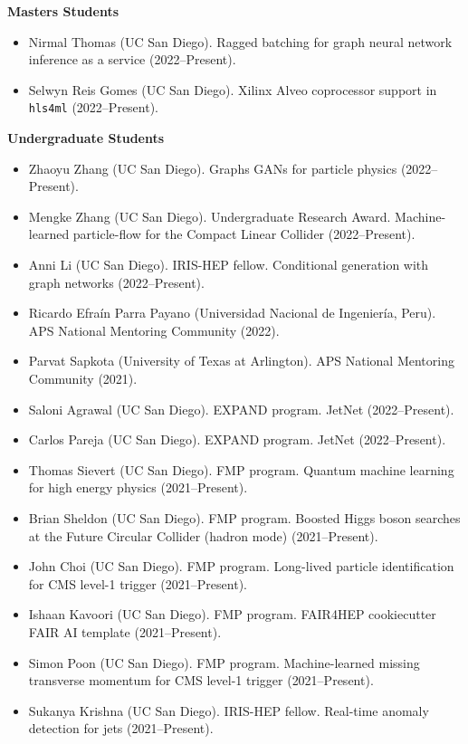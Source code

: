 \documentclass[11pt]{res}
\begin{document}
\begin{resume}
  \textbf{Masters Students}
  \begin{itemize}
    \itemsep-0.3em
    \item Nirmal Thomas (UC San Diego). Ragged batching for graph neural network inference as a service ({2022--Present}).
    \item Selwyn Reis Gomes (UC San Diego). Xilinx Alveo coprocessor support in \texttt{hls4ml} ({2022--Present}).
  \end{itemize}

  \textbf{Undergraduate Students}
  \begin{itemize}
    \itemsep-0.3em
    \item Zhaoyu Zhang (UC San Diego). Graphs GANs for particle physics ({2022--Present}).
    \item Mengke Zhang (UC San Diego). Undergraduate Research Award. Machine-learned particle-flow for the Compact Linear Collider ({2022--Present}).
    \item Anni Li (UC San Diego). IRIS-HEP fellow. Conditional generation with graph networks ({2022--Present}).
    \item Ricardo Efra\'{i}n Parra Payano (Universidad Nacional de Ingenier\'{i}a, Peru). APS National Mentoring Community ({2022}).
    \item Parvat Sapkota (University of Texas at Arlington). APS National Mentoring Community ({2021}).
    \item Saloni Agrawal (UC San Diego). EXPAND program. JetNet ({2022--Present}).
    \item Carlos Pareja (UC San Diego). EXPAND program. JetNet ({2022--Present}).
    \item Thomas Sievert (UC San Diego). FMP program. Quantum machine learning for high energy physics ({2021--Present}).
    \item Brian Sheldon (UC San Diego). FMP program. Boosted Higgs boson searches at the Future Circular Collider (hadron mode) ({2021--Present}).
    \item John Choi (UC San Diego). FMP program. Long-lived particle identification for CMS level-1 trigger ({2021--Present}).
    \item Ishaan Kavoori (UC San Diego). FMP program. FAIR4HEP cookiecutter FAIR AI template ({2021--Present}).
    \item Simon Poon (UC San Diego). FMP program. Machine-learned missing transverse momentum for CMS level-1 trigger ({2021--Present}).
    \item Sukanya Krishna (UC San Diego). IRIS-HEP fellow. Real-time anomaly detection for jets ({2021--Present}).

\end{itemize}
\end{resume}
\end{document}
